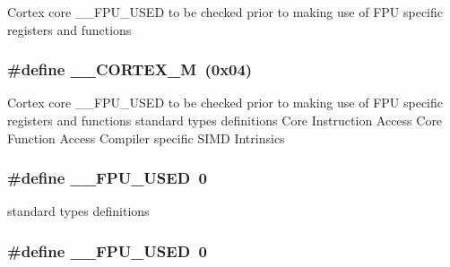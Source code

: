 Cortex core \-\_\-\-\_\-\-F\-P\-U\-\_\-\-U\-S\-E\-D to be checked prior to making use of F\-P\-U specific registers and functions \hypertarget{group___c_m_s_i_s__core__definitions_ga63ea62503c88acab19fcf3d5743009e3}{
\subsubsection[{\-\_\-\-\_\-\-C\-O\-R\-T\-E\-X\-\_\-\-M}]{\setlength{\rightskip}{0pt plus 5cm}\#define \-\_\-\-\_\-\-C\-O\-R\-T\-E\-X\-\_\-\-M~(0x04)}}\label{group___c_m_s_i_s__core__definitions_ga63ea62503c88acab19fcf3d5743009e3}
Cortex core \-\_\-\-\_\-\-F\-P\-U\-\_\-\-U\-S\-E\-D to be checked prior to making use of F\-P\-U specific registers and functions standard types definitions Core Instruction Access Core Function Access Compiler specific S\-I\-M\-D Intrinsics \hypertarget{group___c_m_s_i_s__core__definitions_gaa167d0f532a7c2b2e3a6395db2fa0776}{
\subsubsection[{\-\_\-\-\_\-\-F\-P\-U\-\_\-\-U\-S\-E\-D}]{\setlength{\rightskip}{0pt plus 5cm}\#define \-\_\-\-\_\-\-F\-P\-U\-\_\-\-U\-S\-E\-D~0}}\label{group___c_m_s_i_s__core__definitions_gaa167d0f532a7c2b2e3a6395db2fa0776}
standard types definitions \hypertarget{group___c_m_s_i_s__core__definitions_gaa167d0f532a7c2b2e3a6395db2fa0776}{
\subsubsection[{\-\_\-\-\_\-\-F\-P\-U\-\_\-\-U\-S\-E\-D}]{\setlength{\rightskip}{0pt plus 5cm}\#define \-\_\-\-\_\-\-F\-P\-U\-\_\-\-U\-S\-E\-D~0}}\label{group___c_m_s_i_s__core__definitions_gaa167d0f532a7c2b2e3a6395db2fa0776}
